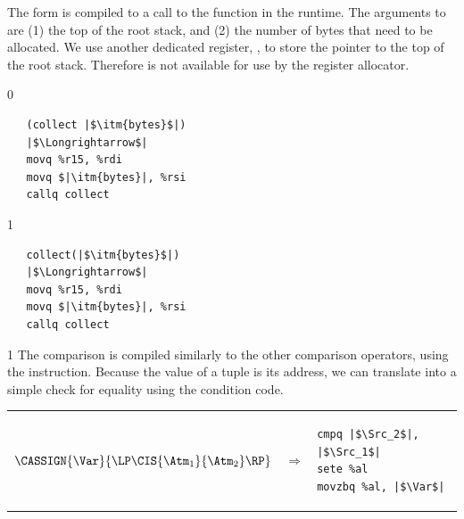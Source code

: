 \documentclass[7x10]{TimesAPriori_MIT}%
\def\racketEd{0}
\def\pythonEd{1}
\providecommand{\BookEdition}{1}
\let\edition\BookEdition
\newcommand{\pythonColor}[0]{}
\numberwithin{theorem}{chapter}
\numberwithin{definition}{chapter}
\numberwithin{equation}{chapter}
\begin{document}
%
The  form is compiled to a call to the 
function in the runtime. The arguments to  are (1) the
top of the root stack, and (2) the number of bytes that need to be
allocated.  We use another dedicated register, , to store
the pointer to the top of the root stack. Therefore  is not
available for use by the register allocator.
%
{\if\edition\racketEd
\begin{lstlisting}
   (collect |$\itm{bytes}$|)
   |$\Longrightarrow$|
   movq %r15, %rdi
   movq $|\itm{bytes}|, %rsi
   callq collect
\end{lstlisting}
\fi}
{\if\edition\pythonEd\pythonColor    
\begin{lstlisting}
   collect(|$\itm{bytes}$|)
   |$\Longrightarrow$|
   movq %r15, %rdi
   movq $|\itm{bytes}|, %rsi
   callq collect
\end{lstlisting}
\fi}

{\if\edition\pythonEd\pythonColor    
The  comparison is compiled similarly to the other comparison
operators, using the  instruction. Because the value of a
tuple is its address, we can translate  into a simple check
for equality using the  condition code. \\
\begin{tabular}{lll}
\begin{minipage}{0.4\textwidth}
$\CASSIGN{\Var}{ \LP\CIS{\Atm_1}{\Atm_2} \RP }$ 
\end{minipage}
&
$\Rightarrow$
&
\begin{minipage}{0.4\textwidth}
\begin{lstlisting}
cmpq |$\Src_2$|, |$\Src_1$|
sete %al
movzbq %al, |$\Var$|
\end{lstlisting}
\end{minipage}
\end{tabular}
\fi}


\newcommand{\GrammarXGlobal}{
\begin{array}{lcl}
  \Instr &::=& \key{andq}~\Src\key{,}~\Dst
          \MID \key{sarq}~\Src\key{,}~\Dst \\
  \Src &::=& \itm{label} \key{(\%rip)} 
\end{array}
}

\newcommand{\ASTXGlobalRacket}{
\begin{array}{lcl}
  \Instr &::=& \BININSTR{\scode{andq}}{\Src}{\Dst} \MID
               \BININSTR{\scode{sarq}}{\Src}{\Dst} \\
  \Src &::=&  \GLOBAL{\itm{label}} 
\end{array}
}
\end{document}

